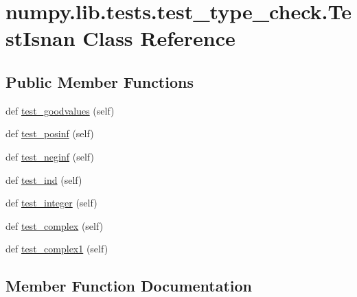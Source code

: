\hypertarget{classnumpy_1_1lib_1_1tests_1_1test__type__check_1_1TestIsnan}{}\section{numpy.\+lib.\+tests.\+test\+\_\+type\+\_\+check.\+Test\+Isnan Class Reference}
\label{classnumpy_1_1lib_1_1tests_1_1test__type__check_1_1TestIsnan}
\subsection*{Public Member Functions}
\begin{DoxyCompactItemize}
\item 
def \hyperlink{classnumpy_1_1lib_1_1tests_1_1test__type__check_1_1TestIsnan_a21c7d0d1585dc7248fb2ca7684d471d8}{test\+\_\+goodvalues} (self)
\item 
def \hyperlink{classnumpy_1_1lib_1_1tests_1_1test__type__check_1_1TestIsnan_a54b7c16921b6daaad0798b611edccc9c}{test\+\_\+posinf} (self)
\item 
def \hyperlink{classnumpy_1_1lib_1_1tests_1_1test__type__check_1_1TestIsnan_ae978dd7c0ea5473692bb1e064bde8f66}{test\+\_\+neginf} (self)
\item 
def \hyperlink{classnumpy_1_1lib_1_1tests_1_1test__type__check_1_1TestIsnan_aeaae311330f9951ef2052d9a00da0e1c}{test\+\_\+ind} (self)
\item 
def \hyperlink{classnumpy_1_1lib_1_1tests_1_1test__type__check_1_1TestIsnan_a3e03513d6fba4dc92b1c46b707d05e66}{test\+\_\+integer} (self)
\item 
def \hyperlink{classnumpy_1_1lib_1_1tests_1_1test__type__check_1_1TestIsnan_a6896aa14152df9dcde9fa88c3c9401c1}{test\+\_\+complex} (self)
\item 
def \hyperlink{classnumpy_1_1lib_1_1tests_1_1test__type__check_1_1TestIsnan_a93bcd8ffe5dd36578ec490575f4d364e}{test\+\_\+complex1} (self)
\end{DoxyCompactItemize}


\subsection{Member Function Documentation}
\mbox{\label{classnumpy_1_1lib_1_1tests_1_1test__type__check_1_1TestIsnan_a6896aa14152df9dcde9fa88c3c9401c1}} 
